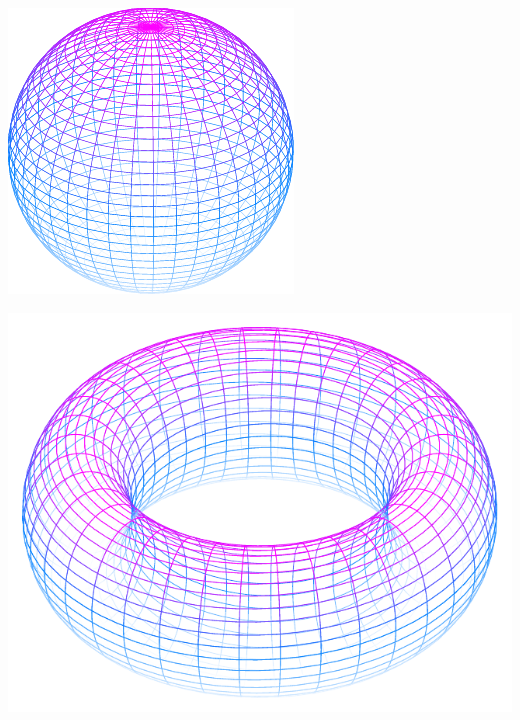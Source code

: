 \documentclass[11pt,openany]{article}
\begin{document}
\begin{center}
\begin{minipage}{.45\textwidth}\centering
\includegraphics[scale=.85]{../tikz/grad-math-tikz-pdf/sphere.pdf}
\end{minipage}
\begin{minipage}{.45\textwidth}\centering
\includegraphics[scale=.45]{../tikz/grad-math-tikz-pdf/torus.pdf}
\end{minipage}
\end{center}
\vfill
\end{document}
